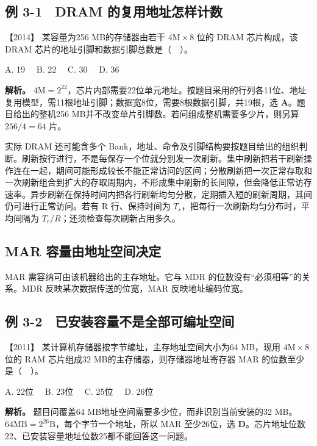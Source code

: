 \subsection{例 3-1　DRAM 的复用地址怎样计数}\label{co-ex3-1}

\noindent{}【2014】 某容量为256 MB的存储器由若干 \(4\mathrm M\times8\) 位的 DRAM 芯片构成，该 DRAM 芯片的地址引脚和数据引脚总数是（　）。

A. 19　 B. 22　 C. 30　 D. 36


\textbf{解析。} \(4\mathrm M=2^{22}\)，芯片内部需要22位单元地址。按题目采用的行列各11位、地址复用模型，需11根地址引脚；数据宽8位，需要8根数据引脚，共19根，选 \textbf{A}。题目给出的整机256 MB并不改变单片引脚数。若问组成整机需要多少片，则另算 \(256/4=64\) 片。

实际 DRAM 还可能含多个 Bank，地址、命令及引脚结构要按题目给出的组织判断。刷新按行进行，不是每保存一个位就分别发一次刷新。集中刷新把若干刷新操作连在一起，期间可能形成较长不能正常访问的区间；分散刷新把一次正常存取和一次刷新组合到扩大的存取周期内，不形成集中刷新的长间隙，但会降低正常访存速率。异步刷新在保持时间内把各行刷新均匀分散，定期插入短的刷新周期，其间仍可进行正常访问。若有 R 行、保持时间为 \(T_r\)，把每行一次刷新均匀分布时，平均间隔为 \(T_r/R\)；还须检查每次刷新占用多久。

\subsection{MAR 容量由地址空间决定}\label{co-c03-h37}

MAR 需容纳可由该机器给出的主存地址。它与 MDR 的位数没有``必须相等''的关系。MDR 反映某次数据传送的位宽，MAR 反映地址编码位宽。

\subsection{例 3-2　已安装容量不是全部可编址空间}\label{co-ex3-2}

\noindent{}【2011】 某计算机存储器按字节编址，主存地址空间大小为64 MB，现用 \(4\mathrm M\times8\) 位的 RAM 芯片组成32 MB的主存储器，则存储器地址寄存器 MAR 的位数至少是（　）。

A. 22位　 B. 23位　 C. 25位　 D. 26位


\textbf{解析。} 题目问覆盖64 MB地址空间需要多少位，而非识别当前安装的32 MB。\(64\mathrm{MB}=2^{26}\mathrm B\)，每个字节一个地址，所以 MAR 至少26位，选 \textbf{D}。芯片地址位数22、已安装容量地址位数25都不能回答这一问题。

